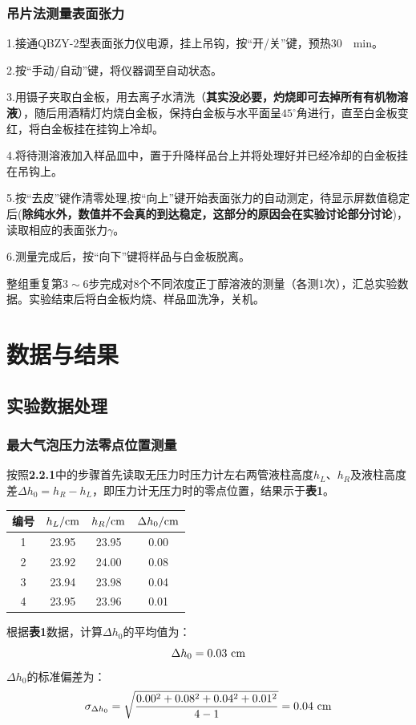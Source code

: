 \documentclass[12pt]{article}
\begin{document}
			\subsubsection{吊片法测量表面张力}
			1.接通QBZY-2型表面张力仪电源，挂上吊钩，按“开/关”键，预热30\ \ min。\par
			2.按“手动/自动”键，将仪器调至自动状态。\par
			3.用镊子夹取白金板，用去离子水清洗（\textbf{其实没必要，灼烧即可去掉所有有机物溶液}），随后用酒精灯灼烧白金板，保持白金板与水平面呈$45^{\circ}$角进行，直至白金板变红，将白金板挂在挂钩上冷却。\par 
			4.将待测溶液加入样品皿中，置于升降样品台上并将处理好并已经冷却的白金板挂在吊钩上。\par
			5.按“去皮”键作清零处理,按“向上”键开始表面张力的自动测定，待显示屏数值稳定后(\textbf{除纯水外，数值并不会真的到达稳定，这部分的原因会在实验讨论部分讨论})，读取相应的表面张力$\gamma$。\par
			6.测量完成后，按“向下”键将样品与白金板脱离。\par
			整组重复第$3\sim6$步完成对8个不同浓度正丁醇溶液的测量（各测1次），汇总实验数据。实验结束后将白金板灼烧、样品皿洗净，关机。

     \vbox{}
	 \section{数据与结果}
 		\subsection{实验数据处理}
 			\subsubsection{最大气泡压力法零点位置测量}
			按照\textbf{2.2.1}中的步骤首先读取无压力时压力计左右两管液柱高度$h_{L}$、$h_{R}$及液柱高度差$\Delta h_{0}=h_{R}-h_{L}$，即压力计无压力时的零点位置，结果示于\textbf{表1}。
			\begin{table}[h]
				\centering
				\begin{tabular}{cccc}
					\toprule
					编号 & $h_{L}/{\rm cm}$ & $h_{R}/{\rm cm}$ & $\Delta h_{0}/{\rm cm}$ \\
					\midrule
					1 & 23.95 & 23.95 & 0.00\\
					2 & 23.92 & 24.00 & 0.08\\
					3 & 23.94 & 23.98 & 0.04\\
					4 & 23.95 & 23.96 & 0.01\\
					\bottomrule
				\end{tabular}
			\end{table}
			\par
			根据\textbf{表1}数据，计算$\Delta h_{0}$的平均值为：
				$$
				\Delta h_{0}=0.03\ {\rm cm}
				$$
			$\Delta h_{0}$的标准偏差为：
				$$
				\sigma_{\Delta h_{0}}=\sqrt{\frac{0.00^{2}+0.08^{2}+0.04^{2}+0.01^{2}}{4-1}}=0.04\ {\rm cm}
				$$
\end{document}

